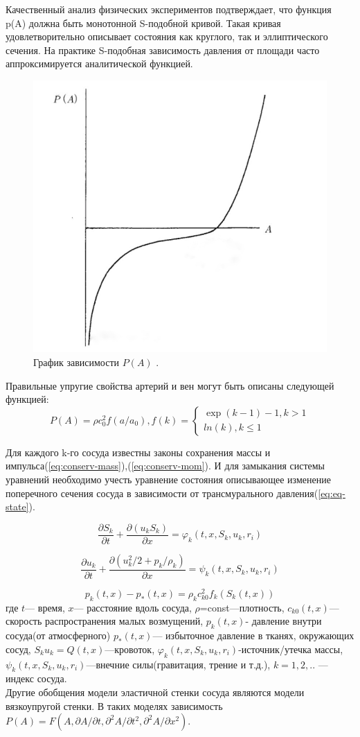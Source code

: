 \documentclass[a4paper, 14pt]{article}
\begin{document}
Качественный анализ физических экспериментов подтверждает, что функция p(A) должна быть монотонной S-подобной кривой. Такая кривая удовлетворительно описывает  состояния как круглого, так и эллиптического сечения. На практике S-подобная  зависимость давления от площади часто аппроксимируется аналитической функцией. 

\begin{figure}[h]
\centering
\includegraphics[width=0.3\linewidth]{IMG_20230309_021324_943-01.jpeg}
\caption{ График зависимости $P(A)$ \cite{pedly:1998}.}
\label{fig:mpr}
\end{figure}

Правильные упругие свойства артерий и вен могут быть описаны следующей функцией\cite{holodov:2001}:
\begin{equation}
	\label{eq:elast-prop}
	P(A)=\rho c^2_0 f(a/a_0), f(k)=\begin{cases}
        \exp(k-1)-1, k>1 \\ ln(k), k \leq 1
    \end{cases}
\end{equation}

Для каждого k-го сосуда известны законы сохранения массы и импульса(\ref{eq:conserv-mass}),(\ref{eq:conserv-mom}). И для замыкания системы уравнений необходимо учесть уравнение состояния описывающее изменение поперечного сечения сосуда в зависимости от трансмурального давления(\ref{eq:eq-state}).

\begin{equation}
	\label{eq:conserv-mass}
	\frac{\partial S_k}{ \partial t} + \frac{\partial(u_kS_k)}{\partial x}=\varphi _k(t,x,S_k,u_k,r_i)
\end{equation}

\begin{equation}
	\label{eq:conserv-mom}
	\frac{\partial u_k}{\partial t} + \frac{\partial(u_k^2/2+p_k/\rho_k)}{\partial x}= \psi_k(t,x,S_k,u_k,r_i)
\end{equation}

\begin{equation}
    \label{eq:eq-state}
    p_k(t,x)-p_*(t,x)=\rho_k c^2_{k0}f_k(S_k(t,x))
\end{equation}
где $t$— время, $x$— расстояние вдоль сосуда, $\rho$=const—плотность, $c_{k0}(t,x)$— скорость распространения малых возмущений,  $p_k(t,x)$- давление внутри сосуда(от атмосферного) $p_*(t,x)$— избыточное давление в тканях, окружающих сосуд, $S_ku_k=Q(t,x)$—кровоток, $\varphi _k(t,x,S_k,u_k,r_i)$-источник/утечка массы, $\psi_k(t,x,S_k,u_k,r_i)$—внечние силы(гравитация, трение и т.д.), $k=1,2,..$ —индекс сосуда.
\\ 
Другие обобщения модели эластичной стенки сосуда являются модели вязкоупругой стенки. В таких моделях зависимость $P(A)=F(A,\partial A / \partial t, \partial^2A / \partial t^2, \partial^2A / \partial x^2)$.\\
\end{document}

